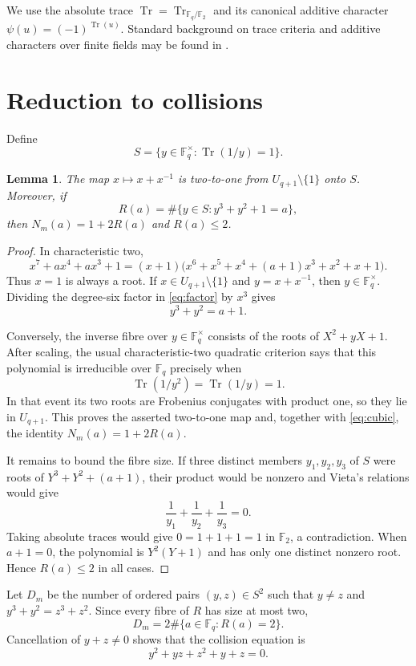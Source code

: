\documentclass[11pt]{article}
\newtheorem{lemma}[theorem]{Lemma}
\newcommand{\F}{\mathbb F}
\newcommand{\Tr}{\operatorname{Tr}}
\begin{document}
We use the absolute trace $\Tr=\Tr_{\F_q/\F_2}$ and its canonical additive
character $\psi(u)=(-1)^{\Tr(u)}$.  Standard background on trace criteria and
additive characters over finite fields may be found in
\cite{LidlNiederreiter1996}.

\section{Reduction to collisions}

Define
\[
 S=\{y\in\F_q^{\times}:\Tr(1/y)=1\}.
\]

\begin{lemma}\label{lem:unit-circle}
The map $x\mapsto x+x^{-1}$ is two-to-one from
$U_{q+1}\setminus\{1\}$ onto $S$.  Moreover, if
\[
 R(a)=\#\{y\in S:y^3+y^2+1=a\},
\]
then $N_m(a)=1+2R(a)$ and $R(a)\leq2$.
\end{lemma}

\begin{proof}
In characteristic two,
\begin{equation}\label{eq:factor}
 x^7+a x^4+a x^3+1
 =(x+1)\bigl(x^6+x^5+x^4+(a+1)x^3+x^2+x+1\bigr).
\end{equation}
Thus $x=1$ is always a root.  If
$x\in U_{q+1}\setminus\{1\}$ and $y=x+x^{-1}$, then
$y\in\F_q^{\times}$.  Dividing the degree-six factor in
\eqref{eq:factor} by $x^3$ gives
\begin{equation}\label{eq:cubic}
 y^3+y^2=a+1.
\end{equation}

Conversely, the inverse fibre over $y\in\F_q^{\times}$ consists of the
roots of $X^2+yX+1$.  After scaling, the usual characteristic-two quadratic
criterion says that this polynomial is irreducible over $\F_q$ precisely when
\[
 \Tr(1/y^2)=\Tr(1/y)=1.
\]
In that event its two roots are Frobenius conjugates with product one, so
they lie in $U_{q+1}$.  This proves the asserted two-to-one map and, together
with \eqref{eq:cubic}, the identity $N_m(a)=1+2R(a)$.

It remains to bound the fibre size.  If three distinct members
$y_1,y_2,y_3$ of $S$ were roots of
$Y^3+Y^2+(a+1)$, their product would be nonzero and Vieta's relations would
give
\[
 \frac1{y_1}+\frac1{y_2}+\frac1{y_3}=0.
\]
Taking absolute traces would give $0=1+1+1=1$ in $\F_2$, a contradiction.
When $a+1=0$, the polynomial is $Y^2(Y+1)$ and has only one distinct
nonzero root.  Hence $R(a)\leq2$ in all cases.
\end{proof}

Let $D_m$ be the number of ordered pairs $(y,z)\in S^2$ such that
$y\ne z$ and $y^3+y^2=z^3+z^2$.  Since every fibre of $R$ has size at
most two,
\begin{equation}\label{eq:D-fibres}
 D_m=2\#\{a\in\F_q:R(a)=2\}.
\end{equation}
Cancellation of $y+z\ne0$ shows that the collision equation is
\begin{equation}\label{eq:collision}
 y^2+yz+z^2+y+z=0.
\end{equation}
\end{document}
